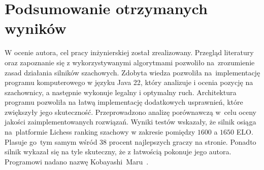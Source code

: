\section {Podsumowanie otrzymanych wyników}
\label {sec: podsumowanie-pracy}

W ocenie autora, cel pracy inżynierskiej został zrealizowany.
Przegląd literatury oraz zapoznanie się z wykorzystywanymi algorytmami pozwoliło na~zrozumienie zasad działania silników szachowych.
Zdobyta wiedza pozwoliła na~implementację programu komputerowego w języku Java 22, który analizuje i ocenia pozycję na szachownicy, a następnie wykonuje legalny i optymalny ruch.
Architektura programu pozwoliła na łatwą implementację dodatkowych usprawnień, które zwiększyły jego skuteczność.
Przeprowadzono analizę porównawczą w~celu oceny jakości zaimplementowanych rozwiązań.
Wyniki testów wskazały, że silnik osiąga na~platformie Lichess ranking szachowy w zakresie pomiędzy $1600$ a $1650$ ELO.
Plasuje go~tym samym wśród 38 procent najlepszych graczy na stronie.
Ponadto silnik wykazał się na tyle skuteczny, że z łatwością pokonuje jego autora.
Programowi nadano nazwę Kobayashi~Maru~\cite*{kobayashi-maru}.